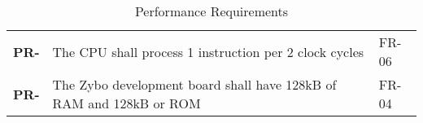 \resetfyshcounter
\newcommand{\pr}[2]{
	\textbf{PR-\rc} & #1 & #2 \\
	\hline
}
\begin{table}[H]
	\begin{tabularx}{\textwidth}{| a | x | a |}
		\hline
		     &  &    \\
		\hline
		\pr{The CPU shall process 1 instruction per 2 clock cycles}{FR-06}
		\pr{The Zybo development board shall have 128kB of RAM and 128kB or ROM}{FR-04}
	\end{tabularx}
	\caption{Performance Requirements}
\end{table}

